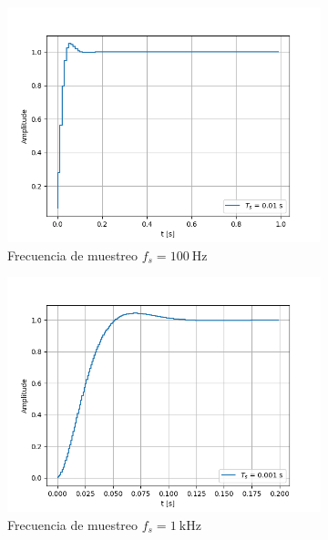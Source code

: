 \documentclass[12pt,a4paper,twoside,fleqn]{article}
\begin{document}
\begin{figure}
    \centering
    \begin{subfigure}{.45\textwidth}
        \includegraphics[width=\textwidth]{img/step_resp_100hz.png}
        \caption{Frecuencia de muestreo $f_s=\qty{100}{\Hz}$}
        \label{fig:step_resp_100}
    \end{subfigure}
    \begin{subfigure}{.45\textwidth}
        \includegraphics[width=\textwidth]{img/step_resp_1000hz.png}
        \caption{Frecuencia de muestreo $f_s=\qty{1}{\kHz}$}
        \label{fig:step_resp_1000}
    \end{subfigure}
    \begin{subfigure}{.45\textwidth}

\end{subfigure}
\end{figure}
\end{document}
